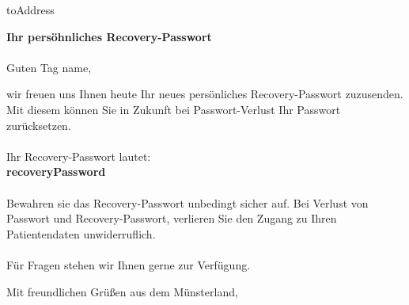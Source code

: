 \documentclass[11pt]{dinbrief}
\begin{document}
\centeraddress
{}
\signature{Ihr Nibyou Team}
\date{\today}
\begin{letter}{ {{toAddress}} }
  \nowindowrules
  \nowindowtics
\opening{ {\Large \textbf{Ihr persöhnliches Recovery-Passwort} } \\ \ \\Guten Tag {{name}}, \\}
wir freuen uns Ihnen heute Ihr neues persönliches Recovery-Passwort zuzusenden. Mit diesem können Sie in Zukunft bei Passwort-Verlust Ihr Passwort zurücksetzen. \\ \ \\
Ihr Recovery-Passwort lautet:\\
\textbf{ {{recoveryPassword}} }
\\ \ \\
Bewahren sie das Recovery-Passwort unbedingt sicher auf. Bei Verlust von Passwort und Recovery-Passwort, verlieren Sie den Zugang zu Ihren Patientendaten unwiderruflich. \\ \ \\
Für Fragen stehen wir Ihnen gerne zur Verfügung.
\closing[]{Mit freundlichen Grüßen aus dem Münsterland,}
\end{letter}
\end{document}
